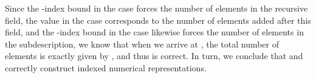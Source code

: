 Since the -index bound in the  case forces the number of elements in the recursive field, the value in the  case corresponds to the number of elements added after this field, and the -index bound in the  case likewise forces the number of elements in the subdescription, we know that when we arrive at , the total number of elements is exactly given by , and thus  is correct. In turn, we conclude that  and  correctly construct indexed numerical representations. 



